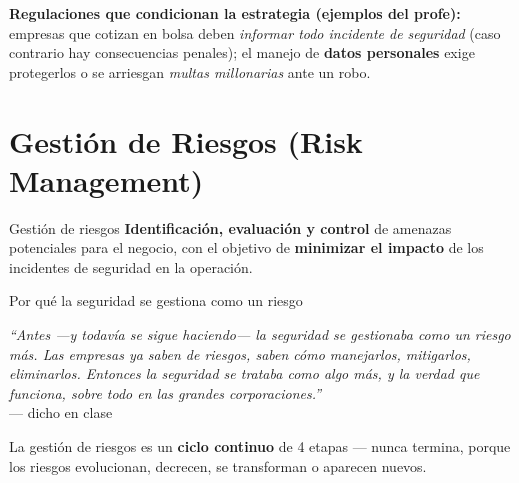 \documentclass[11pt,a4paper]{article}
\newcommand{\prof}[1]{\par\medskip\noindent\textit{``#1''}\\[-2pt]\hspace*{1em}%
  {\footnotesize\textcolor{black!60}{--- dicho en clase}}\par\medskip\noindent}
\begin{document}
\noindent\textbf{Regulaciones que condicionan la estrategia (ejemplos del profe):} empresas que
cotizan en bolsa deben \emph{informar todo incidente de seguridad} (caso contrario hay
consecuencias penales); el manejo de \textbf{datos personales} exige protegerlos o se arriesgan
\emph{multas millonarias} ante un robo.

\section{Gestión de Riesgos (Risk Management)}

\begin{defbox}{Gestión de riesgos}
\textbf{Identificación, evaluación y control} de amenazas potenciales para el negocio, con el
objetivo de \textbf{minimizar el impacto} de los incidentes de seguridad en la operación.
\end{defbox}

\begin{anecbox}{Por qué la seguridad se gestiona como un riesgo}
\prof{Antes —y todavía se sigue haciendo— la seguridad se gestionaba como un riesgo más. Las
empresas ya saben de riesgos, saben cómo manejarlos, mitigarlos, eliminarlos. Entonces la
seguridad se trataba como algo más, y la verdad que funciona, sobre todo en las grandes
corporaciones.}
\end{anecbox}

La gestión de riesgos es un \textbf{ciclo continuo} de 4 etapas — nunca termina, porque los
riesgos evolucionan, decrecen, se transforman o aparecen nuevos.

\begin{center}
\end{center}
\end{document}
